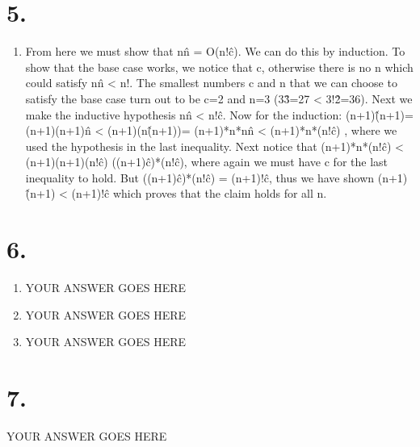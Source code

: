 \documentclass[11pt]{article}
\newenvironment{qparts}{\begin{enumerate}[{(}a{)}]}{\end{enumerate}}
\begin{document}
\section*{5.}
\begin{qparts}
\item
From here we must show that n\^n = O(n!\^c). We can do this by induction. To show that the base case works, we notice that c, otherwise there is no n which could satisfy n\^n < n!. The smallest numbers c and n that we can choose to satisfy the base case turn out to be c=2 and n=3 (3\^3=27 < 3!\^2=36). Next we make the inductive hypothesis n\^n < n!\^c. Now for the induction: (n+1)\^(n+1)= (n+1)(n+1)\^n < (n+1)(n\^(n+1))= (n+1)*n*n\^n < (n+1)*n*(n!\^c) , where we used the hypothesis in the last inequality. Next notice that (n+1)*n*(n!\^c) < (n+1)(n+1)(n!\^c) \leq ((n+1)\^c)*(n!\^c), where again we must have c for the last inequality to hold. But ((n+1)\^c)*(n!\^c) = (n+1)!\^c, thus we have shown (n+1)\^(n+1) < (n+1)!\^c which proves that the claim holds for all n.

\end{qparts}

\newpage
\section*{6.}
\begin{qparts}
\item
YOUR ANSWER GOES HERE

\item
YOUR ANSWER GOES HERE

\item
YOUR ANSWER GOES HERE
\end{qparts}


\newpage
\section*{7.}
YOUR ANSWER GOES HERE
\end{document}

